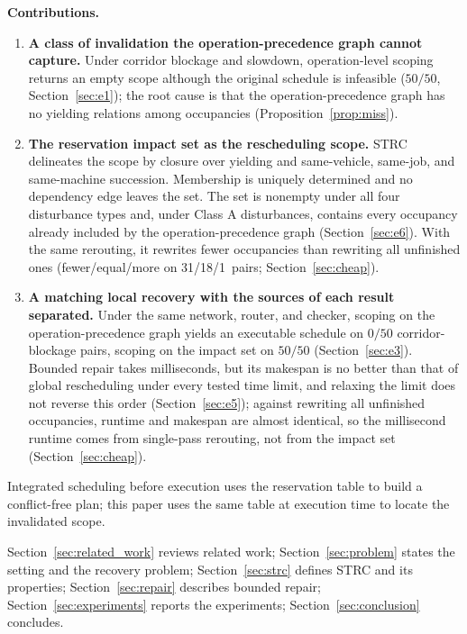 \documentclass[manuscript,screen,review]{acmart}
\providecommand{\STRC}{\textsc{STRC}}
\newcommand{\NPairs}{50}
\newcommand{\PassMiss}{\NPairs/\NPairs}      %
\newcommand{\FeasRone}{0/\NPairs}            %
\newcommand{\FeasRtwo}{\NPairs/\NPairs}      %
\newcommand{\RAStabWTL}{31/18/1}     %
\begin{document}
\textbf{Contributions.}
\begin{enumerate}[label=\textbf{C\arabic*.},leftmargin=2.2em,itemsep=0.3em]
\item \textbf{A class of invalidation the operation-precedence graph cannot capture.}
Under corridor blockage and slowdown, operation-level scoping returns an empty scope although the original schedule is infeasible (\(\PassMiss\), Section~\ref{sec:e1});
the root cause is that the operation-precedence graph has no yielding relations among occupancies (Proposition~\ref{prop:miss}).
\item \textbf{The reservation impact set as the rescheduling scope.}
\STRC{} delineates the scope by closure over yielding and same-vehicle, same-job, and same-machine succession. Membership is uniquely determined and no dependency edge leaves the set.
The set is nonempty under all four disturbance types and, under Class A disturbances, contains every occupancy already included by the operation-precedence graph (Section~\ref{sec:e6}).
With the same rerouting, it rewrites fewer occupancies than rewriting all unfinished ones (fewer/equal/more on \RAStabWTL\ pairs; Section~\ref{sec:cheap}).
\item \textbf{A matching local recovery with the sources of each result separated.}
Under the same network, router, and checker, scoping on the operation-precedence graph yields an executable schedule on \(\FeasRone\) corridor-blockage pairs, scoping on the impact set on \(\FeasRtwo\) (Section~\ref{sec:e3}).
Bounded repair takes milliseconds, but its makespan is no better than that of global rescheduling under every tested time limit, and relaxing the limit does not reverse this order (Section~\ref{sec:e5});
against rewriting all unfinished occupancies, runtime and makespan are almost identical, so the millisecond runtime comes from single-pass rerouting, not from the impact set (Section~\ref{sec:cheap}).
\end{enumerate}
Integrated scheduling before execution uses the reservation table to build a conflict-free plan; this paper uses the same table at execution time to locate the invalidated scope.

Section~\ref{sec:related_work} reviews related work; Section~\ref{sec:problem} states the setting and the recovery problem; Section~\ref{sec:strc} defines \STRC{} and its properties;
Section~\ref{sec:repair} describes bounded repair; Section~\ref{sec:experiments} reports the experiments; Section~\ref{sec:conclusion} concludes.
\end{document}

